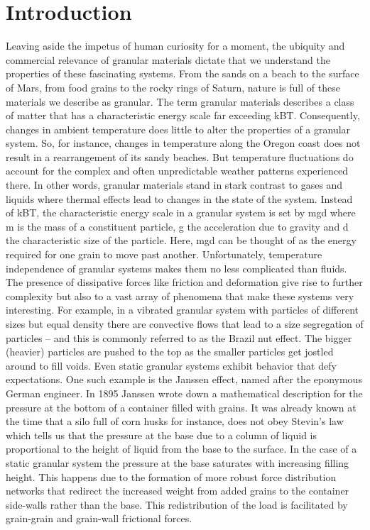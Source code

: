 \chapter{Introduction}

Leaving aside the impetus of human curiosity for a moment, the ubiquity and commercial relevance of granular materials dictate that we understand the properties of these fascinating systems. From the sands on a beach to the surface of Mars, from food grains to the rocky rings of Saturn, nature is full of these materials we describe as granular. 
The term granular materials describes a class of matter that has a characteristic energy scale far exceeding kBT. Consequently, changes in ambient temperature does little to alter the properties of a granular system. So, for instance, changes in temperature along the Oregon coast does not result in a rearrangement of its sandy beaches. But temperature fluctuations do account for the complex and often unpredictable weather patterns experienced there. In other words, granular materials stand in stark contrast to gases and liquids where thermal effects lead to changes in the state of the system. Instead of kBT, the characteristic energy scale in a granular system is set by mgd where m is the mass of a constituent particle, g the acceleration due to gravity and d the characteristic size of the particle. Here, mgd can be thought of as the energy required for one grain to move past another. 
Unfortunately, temperature independence of granular systems makes them no less complicated than fluids. The presence of dissipative forces like friction and deformation give rise to further complexity but also to a vast array of phenomena that make these systems very interesting. For example, in a vibrated granular system with particles of different sizes but equal density there are convective flows that lead to a size segregation of particles – and this is commonly referred to as the Brazil nut effect. The bigger (heavier) particles are pushed to the top as the smaller particles get jostled around to fill voids. 
Even static granular systems exhibit behavior that defy expectations. One such example is the Janssen effect, named after the eponymous German engineer. In 1895 Janssen wrote down a mathematical description for the pressure at the bottom of a container filled with grains. It was already known at the time that a silo full of corn husks for instance, does not obey Stevin’s law which tells us that the pressure at the base due to a column of liquid is proportional to the height of liquid from the base to the surface. In the case of a static granular system the pressure at the base saturates with increasing filling height. This happens due to the formation of more robust force distribution networks that redirect the increased weight from added grains to the container side-walls rather than the base. This redistribution of the load is facilitated by grain-grain and grain-wall frictional forces. 
